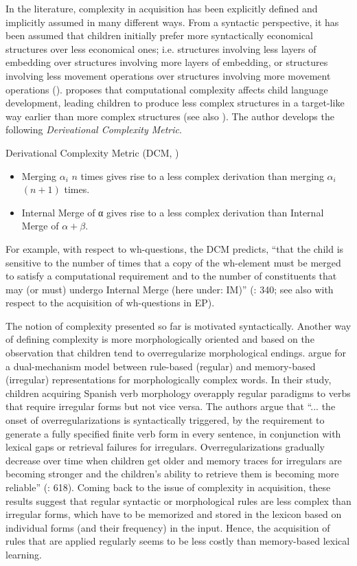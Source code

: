 \documentclass[output=paper]{langscibook}
\begin{document}
In the literature, complexity in acquisition has been explicitly defined and implicitly assumed in many different ways. From a syntactic perspective, it has been assumed that children initially prefer more syntactically economical structures over less economical ones; i.e. structures involving less layers of embedding over structures involving more layers of embedding, or structures involving less movement operations over structures involving more movement operations (\citealt{Hamann2006,Rizzi1990,Rizzi2000}). \citet{Jakubowicz2003} proposes that computational complexity affects child language development, leading children to produce less complex structures in a target-like way earlier than more complex structures (see also \citealt{JakubowiczNash2001}). The author develops the following \textit{Derivational Complexity Metric}.

\ea%
\label{ex:rinke:5}Derivational Complexity Metric (DCM, \citealt{Jakubowicz2011})
\begin{itemize}
\item Merging $\alpha_i$ $n$ times gives rise to a less complex derivation than merging $\alpha_i$ $(n + 1)$ times.
\item Internal Merge of α gives rise to a less complex derivation than Internal Merge of $\alpha + \beta$.
\end{itemize}
\z

For example, with respect to wh-questions, the DCM predicts, “that the child is sensitive to the number of times that a copy of the wh-element must be merged to satisfy a computational requirement and to the number of constituents that may (or must) undergo Internal Merge (here under: IM)” (\citealt{Jakubowicz2011}: 340; see also \citealt{Soares2003} with respect to the acquisition of wh-questions in EP).

The notion of complexity presented so far is motivated syntactically. Another way of defining complexity is more morphologically oriented and based on the observation that children tend to overregularize morphological endings. \citet{ClahsenRoca2002} argue for a dual-mechanism model between rule-based (regular) and memory-based (irregular) representations for morphologically complex words. In their study, children acquiring Spanish verb morphology overapply regular paradigms to verbs that require irregular forms but not vice versa. The authors argue that “... the onset of overregularizations is syntactically triggered, by the requirement to generate a fully specified finite verb form in every sentence, in conjunction with lexical gaps or retrieval failures for irregulars. Overregularizations gradually decrease over time when children get older and memory traces for irregulars are becoming stronger and the children’s ability to retrieve them is becoming more reliable” (\citealt{ClahsenRoca2002}: 618). Coming back to the issue of complexity in acquisition, these results suggest that regular syntactic or morphological rules are less complex than irregular forms, which have to be memorized and stored in the lexicon based on individual forms (and their frequency) in the input. Hence, the acquisition of rules that are applied regularly seems to be less costly than memory-based lexical learning.
\end{document}
